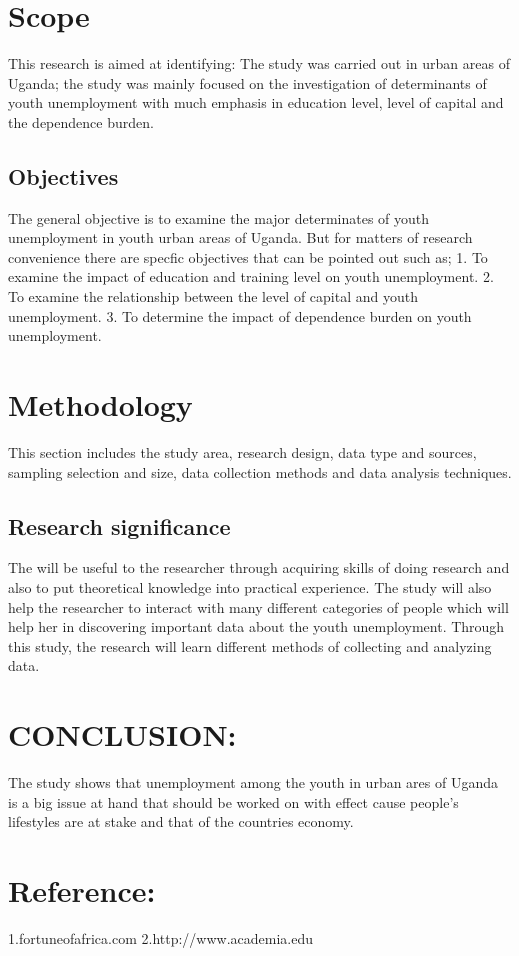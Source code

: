 \documentclass{article}                    %
\begin{document}
\section{Scope}
This research is aimed at identifying:
\vspace{1.08\baselineskip}
The study was carried out in urban areas of Uganda; the study was mainly focused on the investigation of determinants of youth unemployment with much emphasis in education level, level of capital and the dependence burden.
\subsection{Objectives}
The general objective is to examine the major determinates of youth unemployment in youth urban areas of Uganda.
But for matters of research convenience there are specfic objectives that can be pointed out such as;
\vspace{1.08\baselineskip}
{\newline}
1. To examine the impact of education and training level on youth unemployment.
\vspace{1.08\baselineskip}
{\newline}
2. To examine the relationship between the level of capital and youth unemployment.
\vspace{1.08\baselineskip}
{\newline}
3. To determine the impact of dependence burden on youth unemployment.
\section{Methodology}
This section includes the study area, research design, data type and sources, sampling selection and size, data collection methods and data analysis techniques. 
\vspace{2.00\baselineskip}
\subsection{Research significance}
The will be useful to the researcher through acquiring skills of doing research and also to put theoretical knowledge into practical experience. The study will also help the researcher to interact with many different categories of people which will help her in discovering important data about the youth unemployment. Through this study, the research will learn different methods of collecting and analyzing data.
\section{CONCLUSION:}
The study shows that unemployment among the youth in urban ares of Uganda is a big issue at hand that should be worked on with effect cause people's lifestyles are at stake and that of the countries economy.
\newpage
\section{Reference:}
1.fortuneofafrica.com
\vspace{2.00\baselineskip}
{\newline}
2.http://www.academia.edu
\end{document}
